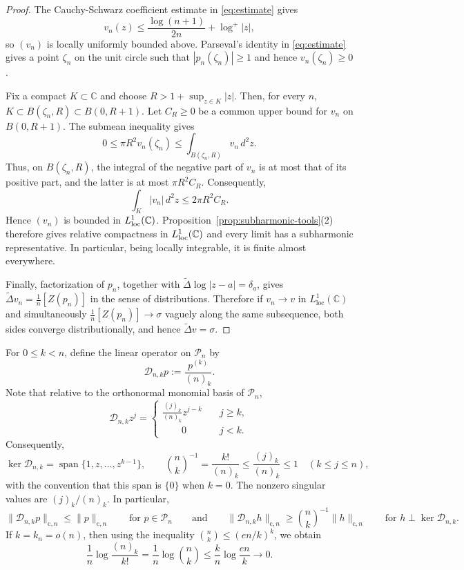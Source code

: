 \documentclass[10pt,reqno]{amsart}
\theoremstyle{remark}
\newcommand{\C}{\mathbb C}
\newcommand{\D}{\mathcal D}
\begin{document}
\begin{proof}
The Cauchy-Schwarz coefficient estimate in \eqref{eq:estimate} gives
\[v_n(z)\le \frac{\log(n+1)}{2n}+\log^+|z|,\]
so $(v_n)$ is locally uniformly bounded above. Parseval's identity in \eqref{eq:estimate} gives a point $\zeta_n$ on the unit circle such that $|p_n(\zeta_n)|\ge 1$ and hence $v_n(\zeta_n)\ge 0$.

Fix a compact $K\subset\C$ and choose $R>1+\sup_{z\in K}|z|$. Then, for every $n$, $K\subset B(\zeta_n,R)\subset B(0,R+1)$. Let $C_R\ge 0$ be a common upper bound for $v_n$ on $B(0,R+1)$. The submean inequality gives
\[0\le \pi R^2v_n(\zeta_n)
      \le \int_{B(\zeta_n,R)}v_n\,d^2z.\]
Thus, on $B(\zeta_n,R)$, the integral of the negative part of $v_n$ is at most that of its positive part, and the latter is at most $\pi R^2C_R$. Consequently,
\[\int_K |v_n|\,d^2z\le 2\pi R^2C_R.\]
Hence $(v_n)$ is bounded in $L^1_{\rm loc}(\C)$. Proposition~\ref{prop:subharmonic-tools}(2) therefore gives relative compactness in $L^1_{\rm loc}(\C)$ and every limit has a subharmonic representative. In particular, being locally integrable, it is finite almost everywhere.

Finally, factorization of $p_n$, together with $\widetilde{\Delta}\log|z-a|=\delta_a$, gives $\widetilde{\Delta} v_n=\frac{1}{n}[Z(p_n)]$ in the sense of distributions. Therefore if $v_n\to v$ in $L^1_{\mathrm{loc}}(\C)$ and simultaneously $\frac{1}{n}[Z(p_n)]\to\sigma$
vaguely along the same subsequence, both sides converge distributionally, and hence $\widetilde{\Delta}v=\sigma$.
\end{proof}

For $0\le k<n$, define the linear operator on $\mathcal{P}_n$ by
\[\D_{n,k}p:=\frac{p^{(k)}}{(n)_k}.\] Note that relative to the orthonormal monomial basis of $\mathcal{P}_n$, 
\[\D_{n,k}z^j=\begin{cases}\frac{(j)_k}{(n)_k}z^{j-k}\quad &j\ge k,\\
 \qquad 0\quad &j<k.\end{cases}\]
Consequently,
\begin{equation}\label{eq:bin-estimate}\ker \D_{n,k}=\operatorname{span}\{1,z,\ldots,z^{k-1}\},
 \qquad
 \binom{n}{k}^{-1}=\frac{k!}{(n)_k}\leq\frac{(j)_k}{(n)_k}\le 1
 \quad(k\le j\le n),
\end{equation}
with the convention that this span is $\{0\}$ when $k=0$. The nonzero singular values are $(j)_k/(n)_k$. In particular,
\begin{equation}\label{eq:contraction}
\|\D_{n,k}p\|_{\mathrm{c},n}\le \|p\|_{\mathrm{c},n}\qquad\text{for }p\in \mathcal{P}_n\qquad\text{and}\qquad \|\D_{n,k}h\|_{\mathrm{c},n}\ge\binom{n}{k}^{-1}\|h\|_{\mathrm{c},n}\qquad\text{for }h\perp\ker \D_{n,k}.
\end{equation}
If $k=k_n=o(n)$, then using the inequality $\binom{n}{k}\le (en/k)^k$, we obtain
\[\frac{1}{n}\log \frac{(n)_k}{k!}=\frac{1}{n}\log\binom{n}{k}\le \frac{k}{n}\log\frac{en}{k}\to 0.\]
\end{document}

